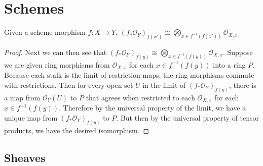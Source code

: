 \section{Schemes}

\begin{lem}\label{lem:directimagestalks}
	Given a scheme morphism $f: X\to Y $, $(f_\ast \mathcal{O}_Y)_{f(x')} \cong \bigotimes_{x \in f^{-1}(f(x'))} \mathcal{O}_{X,x} $
\end{lem}
\begin{proof}
	Next we can then see that $(f_\ast \mathcal{O}_Y)_{f(y)} \cong \bigotimes_{x \in f^{-1}(f(y))} \mathcal{O}_{X,x}$.
	Suppose we are given ring morphisms from $\mathcal{O}_{X,x} $ for each $x \in f^{-1}(f(y)) $ into a ring $P $.
	Because each stalk is the limit of restriction maps, the ring morphisms commute with restrictions.
	Then for every open set $U $ in the limit of $(f_\ast \mathcal{O}_Y)_{f(y)} $, there is a map from $\mathcal{O}_Y(U) $ to $P $ that agrees when restricted to each $\mathcal{O}_{X,x} $ for each $x \in f^{-1}(f(y))$.
	Therefore by the universal property of the limit, we have a unique map from $(f_\ast \mathcal{O}_Y)_{f(y)} $ to $P $.
	But then by the universal property of tensor products, we have the desired isomorphism.
\end{proof}

\subsection{Sheaves}

